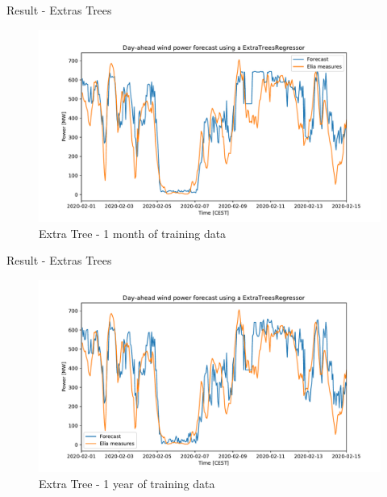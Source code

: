 \documentclass[12pt]{beamer}
\begin{document}
\begin{frame}{Result - Extras Trees}
    \begin{figure}
        \centering
        \includegraphics[width=\textwidth]{resources/pdf/xt_1month.pdf}
        \caption{Extra Tree - 1 month of training data}
    \end{figure}
\end{frame}

\begin{frame}{Result - Extras Trees}
    \begin{figure}
        \centering
        \includegraphics[width=\textwidth]{resources/pdf/xt_one_year.pdf}
        \caption{Extra Tree - 1 year of training data}
    \end{figure}
\end{frame}
\end{document}
